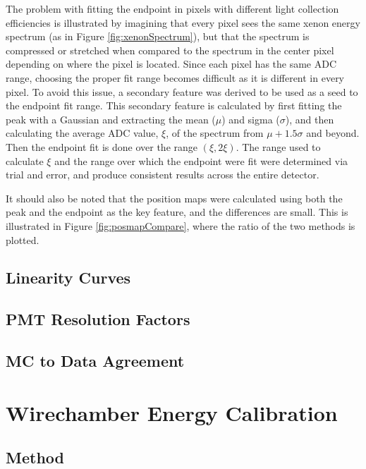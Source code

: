 The problem with fitting the endpoint in pixels with different light collection efficiencies is illustrated by
imagining that every pixel sees the same xenon energy spectrum (as in Figure \ref{fig:xenonSpectrum}), but that
the spectrum is compressed or stretched when compared to the spectrum in the center pixel depending on where
the pixel is located. Since each pixel has the same ADC range, choosing the proper fit range becomes difficult
as it is different in every pixel. To avoid this issue, a secondary feature was derived to be used as a
seed to the endpoint fit range. This secondary feature is calculated by first fitting the peak with a Gaussian
and extracting the mean ($\mu$) and sigma ($\sigma$), and then calculating the average ADC value, $\xi$, of the spectrum
from $\mu+1.5\sigma$ and beyond. Then the endpoint fit is done over the range $(\xi,2\xi)$. The range used to
calculate $\xi$ and the range over which the endpoint were fit were determined via trial and error, and produce
consistent results across the entire detector.

It should also be noted that the position maps were calculated using both the peak and the endpoint as the key
feature, and the differences are small. This is illustrated in Figure \ref{fig:posmapCompare}, where the
ratio of the two methods is plotted.


\subsection{Linearity Curves}
\subsection{PMT Resolution Factors} \label{ssec:PMTresolution}
\subsection{MC to Data Agreement}



\section{Wirechamber Energy Calibration}

\subsection{Method}


